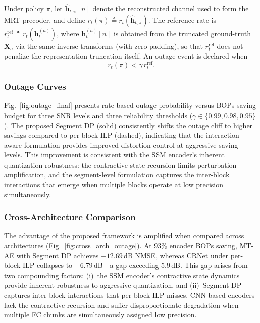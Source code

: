\documentclass[conference]{IEEEtran}
\begin{document}
Under policy $\pi$, let $\hat{\mathbf{h}}_{t,\pi}[n]$ denote the reconstructed channel used to form the MRT precoder, and define $r_t(\pi) \triangleq r_t(\hat{\mathbf{h}}_{t,\pi})$. The reference rate is $r_t^{\mathrm{ref}} \triangleq r_t(\mathbf{h}_t^{(a)})$, where $\mathbf{h}_t^{(a)}[n]$ is obtained from the truncated ground-truth $\mathbf{X}_a$ via the same inverse transforms (with zero-padding), so that $r_t^{\mathrm{ref}}$ does not penalize the representation truncation itself. An outage event is declared when
\begin{equation}
r_t(\pi) < \gamma\, r_t^{\mathrm{ref}}.
\label{eq:outage_event}
\end{equation}

\subsubsection{Outage Curves}
Fig.~\ref{fig:outage_final} presents rate-based outage probability versus BOPs saving budget for three SNR levels and three reliability thresholds ($\gamma \in \{0.99, 0.98, 0.95\}$). The proposed Segment DP (solid) consistently shifts the outage cliff to higher savings compared to per-block ILP (dashed), indicating that the interaction-aware formulation provides improved distortion control at aggressive saving levels.
This improvement is consistent with the SSM encoder's inherent quantization robustness: the contractive state recursion limits perturbation amplification, and the segment-level formulation captures the inter-block interactions that emerge when multiple blocks operate at low precision simultaneously.

\subsubsection{Cross-Architecture Comparison}
The advantage of the proposed framework is amplified when compared across architectures (Fig.~\ref{fig:cross_arch_outage}). At 93\% encoder BOPs saving, MT-AE with Segment DP achieves $-12.69$\,dB NMSE, whereas CRNet under per-block ILP collapses to $-6.79$\,dB---a gap exceeding 5.9\,dB. This gap arises from two compounding factors: (i)~the SSM encoder's contractive state dynamics provide inherent robustness to aggressive quantization, and (ii)~Segment DP captures inter-block interactions that per-block ILP misses. CNN-based encoders lack the contractive recursion and suffer disproportionate degradation when multiple FC chunks are simultaneously assigned low precision.
\end{document}
